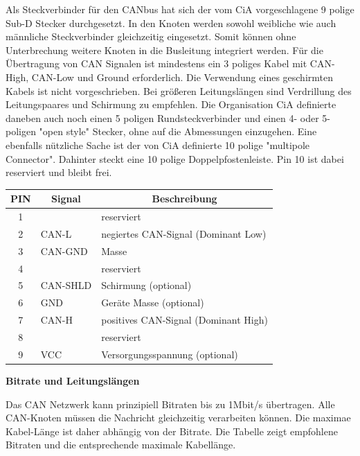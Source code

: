 Als Steckverbinder für den CANbus hat sich der vom CiA vorgeschlagene 9 polige Sub-D
Stecker durchgesetzt. In den Knoten werden sowohl weibliche wie auch männliche
Steckverbinder gleichzeitig eingesetzt. Somit können ohne Unterbrechung weitere Knoten
in die Busleitung integriert werden.
Für die Übertragung von CAN Signalen ist mindestens ein 3 poliges Kabel mit CAN-High,
CAN-Low und Ground erforderlich. Die Verwendung eines geschirmten Kabels ist nicht
vorgeschrieben. Bei größeren Leitungslängen sind Verdrillung des Leitungspaares und
Schirmung zu empfehlen.
Die Organisation CiA definierte daneben auch noch einen 5 poligen Rundsteckverbinder
und einen 4- oder 5-poligen "open style" Stecker, ohne auf die Abmessungen einzugehen.
Eine ebenfalls nützliche Sache ist der von CiA definierte 10 polige "multipole Connector".
Dahinter steckt eine 10 polige Doppelpfostenleiste. Pin 10 ist dabei reserviert und bleibt
frei.

\newpage

\begin{table}[H]
	\begin{tabular}{|c|l|l|}
		\hline
		\textbf{PIN} & \multicolumn{1}{c|}{\textbf{Signal}} & \multicolumn{1}{c|}{\textbf{Beschreibung}} \\ \hline
		1 &          & reserviert                           \\ \hline
		2 & CAN-L    & negiertes CAN-Signal (Dominant Low)  \\ \hline
		3 & CAN-GND  & Masse                                \\ \hline
		4 &          & reserviert                           \\ \hline
		5 & CAN-SHLD & Schirmung (optional)                 \\ \hline
		6 & GND      & Geräte Masse (optional)              \\ \hline
		7 & CAN-H    & positives CAN-Signal (Dominant High) \\ \hline
		8 &          & reserviert                           \\ \hline
		9 & VCC      & Versorgungsspannung (optional)       \\ \hline
	\end{tabular}
\end{table}

\textbf{Bitrate und Leitungslängen}

Das CAN Netzwerk kann prinzipiell Bitraten bis zu 1Mbit/s übertragen. Alle CAN-Knoten
müssen die Nachricht gleichzeitig verarbeiten können. Die maximae Kabel-Länge ist
daher abhängig von der Bitrate. Die Tabelle zeigt empfohlene Bitraten und die
entsprechende maximale Kabellänge.

